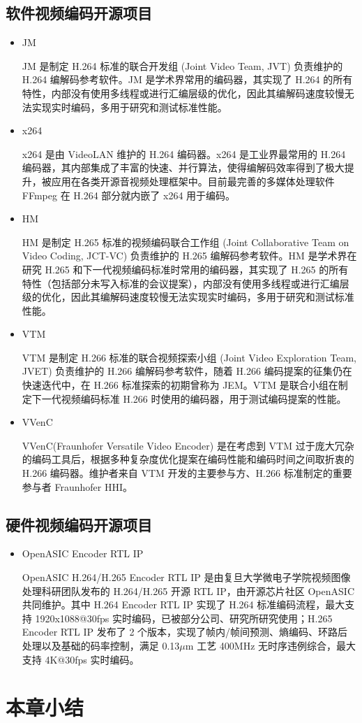 \subsection{软件视频编码开源项目}
\begin{itemize}
    \item JM

          JM 是制定 H.264 标准的联合开发组 (Joint Video Team, JVT) 负责维护的 H.264 编解码参考软件。JM 是学术界常用的编码器，其实现了 H.264 的所有特性，内部没有使用多线程或进行汇编层级的优化，因此其编解码速度较慢无法实现实时编码，多用于研究和测试标准性能。

    \item x264

          x264 是由 VideoLAN 维护的 H.264 编码器。x264 是工业界最常用的 H.264 编码器，其内部集成了丰富的快速、并行算法，使得编解码效率得到了极大提升，被应用在各类开源音视频处理框架中。目前最完善的多媒体处理软件 FFmpeg 在 H.264 部分就内嵌了 x264 用于编码。

    \item HM

          HM 是制定 H.265 标准的视频编码联合工作组 (Joint Collaborative Team on Video Coding, JCT-VC) 负责维护的 H.265 编解码参考软件。HM 是学术界在研究 H.265 和下一代视频编码标准时常用的编码器，其实现了 H.265 的所有特性（包括部分未写入标准的会议提案），内部没有使用多线程或进行汇编层级的优化，因此其编解码速度较慢无法实现实时编码，多用于研究和测试标准性能。

    \item VTM

          VTM 是制定 H.266 标准的联合视频探索小组 (Joint Video Exploration Team, JVET) 负责维护的 H.266 编解码参考软件，随着 H.266 编码提案的征集仍在快速迭代中，在 H.266 标准探索的初期曾称为 JEM。VTM 是联合小组在制定下一代视频编码标准 H.266 时使用的编码器，用于测试编码提案的性能。

    \item VVenC

          VVenC(Fraunhofer Versatile Video Encoder) 是在考虑到 VTM 过于庞大冗杂的编码工具后，根据多种复杂度优化提案在编码性能和编码时间之间取折衷的 H.266 编码器。维护者来自 VTM 开发的主要参与方、H.266 标准制定的重要参与者 Fraunhofer HHI。
\end{itemize}

\subsection{硬件视频编码开源项目}
\begin{itemize}
    \item OpenASIC Encoder RTL IP

          OpenASIC H.264/H.265 Encoder RTL IP 是由复旦大学微电子学院视频图像处理科研团队发布的 H.264/H.265 开源 RTL IP，由开源芯片社区 OpenASIC 共同维护。其中 H.264 Encoder RTL IP 实现了 H.264 标准编码流程，最大支持 1920x1088@30fps 实时编码，已被部分公司、研究所研究使用；H.265 Encoder RTL IP 发布了 2 个版本，实现了帧内/帧间预测、熵编码、环路后处理以及基础的码率控制，满足 0.13$\mu$m 工艺 400MHz 无时序违例综合，最大支持 4K@30fps 实时编码。
\end{itemize}

\section{本章小结}